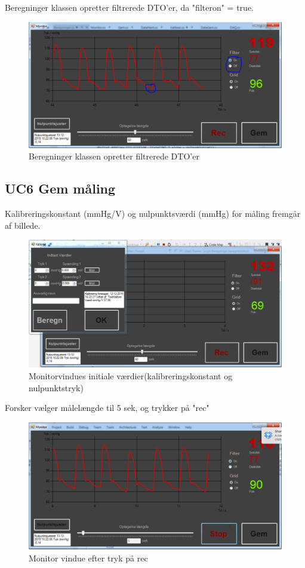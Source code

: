 Beregninger klassen opretter filtrerede DTO'er, da "filteron" = true.

\begin{figure}[H]
	\centering
	\includegraphics[width=1\textwidth]{Figurer/Test_Aktiver_3}
	\caption{Beregninger klassen opretter filtrerede DTO'er}
\end{figure}

\subsection{UC6 Gem måling}
Kalibreringskonstant (mmHg/V) og nulpunktsværdi (mmHg) for måling fremgår af billede.
\begin{figure}[H]
	\centering
	\includegraphics[width=1\textwidth]{Figurer/UC6_InitialConditions}
	\caption{Monitorvindues initiale værdier(kalibreringskonstant og nulpunktstryk)}
\end{figure}
 
 Forsker vælger målelængde til 5 sek, og trykker på "rec"
 
\begin{figure}[H]
	\centering
	\includegraphics[width=1\textwidth]{Figurer/UC6_ForceRecEnd}
	\caption{Monitor vindue efter tryk på rec}
\end{figure}

